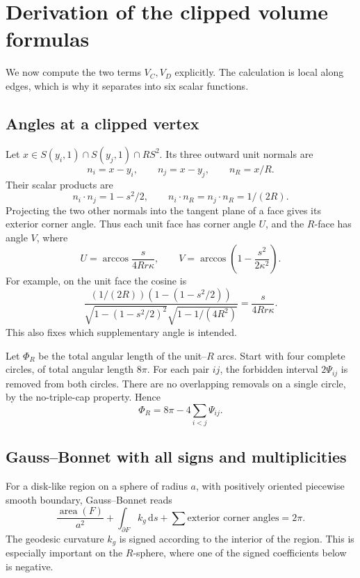 \documentclass[11pt]{article}
\numberwithin{equation}{section}
\theoremstyle{definition}\newtheorem{definition}[theorem]{Definition}
\theoremstyle{remark}\newtheorem{remark}[theorem]{Remark}
\newcommand{\dd}{\,\mathrm d}
\begin{document}
\section{Derivation of the clipped volume formulas}\label{sec:volformula}
We now compute the two terms $V_C,V_D$ explicitly. The calculation is local
along edges, which is why it separates into six scalar functions.

\subsection{Angles at a clipped vertex}
Let $x\in S(y_i,1)\cap S(y_j,1)\cap RS^2$. Its three outward unit normals are
\[
 n_i=x-y_i,\qquad n_j=x-y_j,\qquad n_R=x/R.
\]
Their scalar products are
\[
 n_i\cdot n_j=1-s^2/2,\qquad
 n_i\cdot n_R=n_j\cdot n_R=1/(2R).
\]
Projecting the two other normals into the tangent plane of a face gives
its exterior corner angle. Thus each unit face has corner angle $U$, and the
$R$-face has angle $V$, where
\begin{equation}\label{eq:UV}
 U=\arccos\frac{s}{4Rr\kappa},\qquad
 V=\arccos\left(1-\frac{s^2}{2\kappa^2}\right).
\end{equation}
For example, on the unit face the cosine is
\[
 \frac{(1/(2R))(1-(1-s^2/2))}
 {\sqrt{1-(1-s^2/2)^2}\sqrt{1-1/(4R^2)}}
 =\frac{s}{4Rr\kappa}.
\]
This also fixes which supplementary angle is intended.

Let $\Phi_R$ be the total angular length of the unit--$R$ arcs. Start with
four complete circles, of total angular length $8\pi$. For each pair $ij$,
the forbidden interval $2\Psi_{ij}$ is removed from both circles. There
are no overlapping removals on a single circle, by the no-triple-cap property.
Hence
\begin{equation}\label{eq:PhiR}
 \Phi_R=8\pi-4\sum_{i<j}\Psi_{ij}.
\end{equation}

\subsection{Gauss--Bonnet with all signs and multiplicities}
For a disk-like region on a sphere of radius $a$, with positively oriented
piecewise smooth boundary, Gauss--Bonnet reads
\[
 \frac{\operatorname{area}(F)}{a^2}
 +\int_{\partial F}k_g\dd s+\sum\text{exterior corner angles}=2\pi.
\]
The geodesic curvature $k_g$ is signed according to the interior of the region.
This is especially important on the $R$-sphere, where one of the signed
coefficients below is negative.
\end{document}
